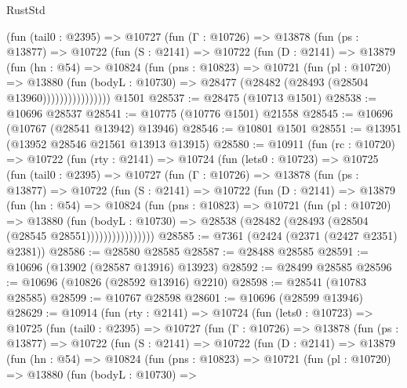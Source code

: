 \begin{lexlean}{RustStd}
\begin{coremodule}
            (fun (tail0 : @2395) =>
            @10727
              (fun (Γ : @10726) =>
              @13878
                (fun (ps : @13877) =>
                @10722
                  (fun (S : @2141) =>
                  @10722
                    (fun (D : @2141) =>
                    @13879
                      (fun (hn : @54) =>
                      @10824
                        (fun (pns : @10823) =>
                        @10721
                          (fun (pl : @10720) =>
                          @13880
                            (fun (bodyL : @10730) =>
                            @28477 (@28482 (@28493 (@28504 @13960))))))))))))))))
    @1501
@28537 := @28475 (@10713 @1501)
@28538 := @10696 @28537
@28541 := @10775 (@10776 @1501) @21558
@28545 := @10696 (@10767 (@28541 @13942) @13946)
@28546 := @10801 @1501
@28551 := @13951 (@13952 @28546 @21561 @13913 @13915)
@28580 := @10911
    (fun (rc : @10720) =>
    @10722
      (fun (rty : @2141) =>
      @10724
        (fun (lets0 : @10723) =>
        @10725
          (fun (tail0 : @2395) =>
          @10727
            (fun (Γ : @10726) =>
            @13878
              (fun (ps : @13877) =>
              @10722
                (fun (S : @2141) =>
                @10722
                  (fun (D : @2141) =>
                  @13879
                    (fun (hn : @54) =>
                    @10824
                      (fun (pns : @10823) =>
                      @10721
                        (fun (pl : @10720) =>
                        @13880
                          (fun (bodyL : @10730) =>
                          @28538 (@28482 (@28493 (@28504 (@28545 @28551))))))))))))))))
@28585 := @7361 (@2424 (@2371 (@2427 @2351) @2381))
@28586 := @28580 @28585
@28587 := @28488 @28585
@28591 := @10696 (@13902 (@28587 @13916) @13923)
@28592 := @28499 @28585
@28596 := @10696 (@10826 (@28592 @13916) @2210)
@28598 := @28541 (@10783 @28585)
@28599 := @10767 @28598
@28601 := @10696 (@28599 @13946)
@28629 := @10914
    (fun (rty : @2141) =>
    @10724
      (fun (lets0 : @10723) =>
      @10725
        (fun (tail0 : @2395) =>
        @10727
          (fun (Γ : @10726) =>
          @13878
            (fun (ps : @13877) =>
            @10722
              (fun (S : @2141) =>
              @10722
                (fun (D : @2141) =>
                @13879
                  (fun (hn : @54) =>
                  @10824
                    (fun (pns : @10823) =>
                    @10721
                      (fun (pl : @10720) =>
                      @13880
                        (fun (bodyL : @10730) =>

\end{coremodule}
\end{lexlean}
